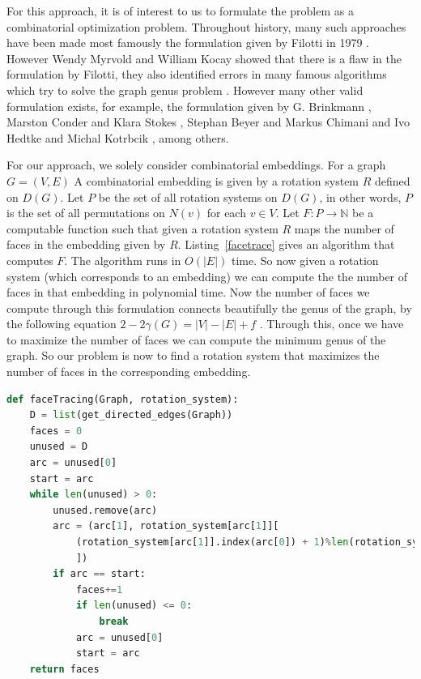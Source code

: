 \documentclass{article}
\begin{document}
    For this approach, it is of interest to us to formulate the problem as a combinatorial optimization problem. 
    Throughout history, many such approaches have been made most famously the formulation given by Filotti in 1979 \cite{Filotti79}. However Wendy Myrvold and William Kocay showed that there is a flaw in the formulation by Filotti, they also identified errors in many famous algorithms which try to solve the graph genus problem \cite{Myrvold11}.
    However many other valid formulation exists, for example, the formulation given by G. Brinkmann \cite{brinkmann20}, Marston Conder and Klara Stokes \cite{Conder19}, Stephan Beyer and Markus Chimani and Ivo Hedtke and Michal Kotrbcik \cite{Beyer16}, among others.
    
    For our approach, we solely consider combinatorial embeddings. For a graph $G = (V, E)$
    A combinatorial embedding is given by a rotation system $R$ defined on $D(G)$. Let $P$ be the set of all rotation systems on $D(G)$, in other words, $P$ is the set of all permutations on $N(v)$ for each $v\in V$.
    Let $F: P \to \mathbb{N}$ be a computable function such that given a rotation system $R$ maps the number of faces in the embedding given by $R$. Listing~\ref{facetrace} gives an algorithm that computes $F$. The algorithm runs in $O(|E|)$ time. 
    So now given a rotation system (which corresponds to an embedding) we can compute the the number of faces in that embedding in polynomial time. 
    Now the number of faces we compute through this formulation connects beautifully the genus of the graph, by the following equation $2 - 2\gamma(G) = |V| - |E| + f$ \cite{Massey91}.
    Through this, once we have to maximize the number of faces we can compute the minimum genus of the graph. So our problem is now to find a rotation system that maximizes the number of faces in the corresponding embedding.
 
\begin{lstlisting}[language=Python, caption = Facetracing Algorithm, label= facetrace]
def faceTracing(Graph, rotation_system):
    D = list(get_directed_edges(Graph))
    faces = 0 
    unused = D
    arc = unused[0]
    start = arc
    while len(unused) > 0:
        unused.remove(arc)
        arc = (arc[1], rotation_system[arc[1]][
            (rotation_system[arc[1]].index(arc[0]) + 1)%len(rotation_system[arc[1]])
            ])
        if arc == start:
            faces+=1
            if len(unused) <= 0:
                break
            arc = unused[0]
            start = arc
    return faces
\end{lstlisting}
\end{document}
